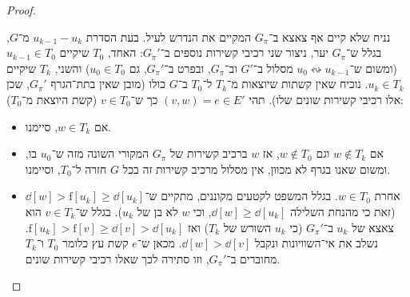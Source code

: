 \documentclass[]{../../../../tex/classes/homework}
\newcommand\ff{\mathrm{f}}
\newcommand\squigd{\leftrightsquigarrow}
\begin{document}
\begin{enumerate}[(A)]
\begin{proof}
\begin{itemize}
				נניח שלא קיים אף צאצא ב־$G_\pi$ המקיים את הנדרש לעיל. בעת הסדרת $u_{k -1} - u_k$ מ־$G$, בגלל ש־$G_{\pi}$ יער, ניצור שני רכיבי קשירות נוספים ב־$G_\pi'$: האחד, $T_0$ שיקיים $u_{k - 1} \in T_0$ (ומשום ש־$u_0 \squigd u_{k -1}$ מסלול ב־$G'$ וב־$G_\pi$, ובפרט ב־$G_\pi'$, גם $u_0 \in T_0$) והשני, $T_k$ שיקיים $u_k \in T_k$. נוכיח שאין קשתות שיוצאות מ־$T_k$ ל־$T_0$ ב־$G$ כולו (מובן שאין בתת־הגרף $G_\pi'$, שכן אלו רכיבי קשירות שונים שלו). תהי $(v, w) = e \in E'$ כך ש־$v \in T_0$ (קשת היוצאת מ־$T_0$): 
				\begin{itemize}
					\item אם $w \in T_k$, סיימנו. 
					\item אם $w \notin T_k$ וגם $w \notin T_0$, אז $w$ ברכיב קשירות של $G_\pi$ המקורי השונה מזה ש־$u_0$ בו, ומשום שאנו בגרף לא מכוון, אין מסלול מרכיב קשירות זה בכל $G$ חזרה ל־$T_0$, וסיימנו. 
					\item אחרת $w \in T_0$. בגלל המשפט לקטעים מקוננים, מתקיים ש־$\dd[w] > \ff[u_k] \ge \dd[u_k]$ (זאת כי מהנחת השלילה $\dd[w] \ge \dd[u_k]$, וכי $w$ לא בן של $u_k$). בגלל ש־$v \in T_k$ הוא צאצא של $u_k$ ב־$G_\pi'$ (כי $u_k$ השורש של $T_k$) ואז $\ff[u_k] > \ff[v] \ge \dd[v] > \dd[u_k]$. נשלב את אי־השוויונות ונקבל $\dd[w] > \dd[v]$. מכאן ש־$e$ קשת עץ כלומר $T_0$ ו־$T_k$ מחוברים ב־$G_\pi'$, וזו סתירה לכך שאלו רכיבי קשירות שונים. 
					

\end{itemize}
\end{itemize}
\end{proof}
\end{enumerate}
\end{document}
